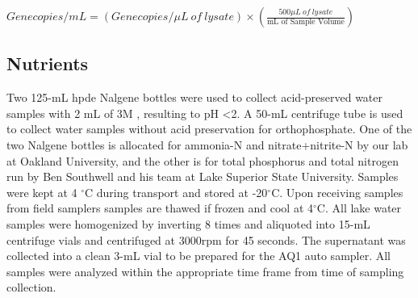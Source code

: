 \begin{center}
  $Genecopies/mL = (Genecopies/\mu L \: of \: lysate) \times (\frac{500\mu L \: of \: lysate}{\text{mL of Sample Volume}})$
\end{center}

\subsection{Nutrients}

Two 125-mL \gls{hpde} Nalgene bottles were used to collect acid-preserved water samples with 2 mL of 3M , resulting to pH \textless 2. A 50-mL centrifuge tube is used to collect water samples without acid preservation for orthophosphate. One of the two Nalgene bottles is allocated for ammonia-N and nitrate+nitrite-N by our lab at Oakland University, and the other is for total phosphorus and total nitrogen run by Ben Southwell and his team at Lake Superior State University.  Samples were kept  at 4 $^\circ$C during transport and stored at -20$^\circ$C. Upon receiving samples from field samplers samples are thawed if frozen and cool at 4$^\circ$C. All lake water samples were homogenized by inverting 8 times and aliquoted into 15-mL centrifuge vials and centrifuged at 3000rpm for 45 seconds. The supernatant was collected into a clean 3-mL vial to be prepared for the AQ1 auto sampler. All samples were analyzed within the appropriate time frame from time of sampling collection.


